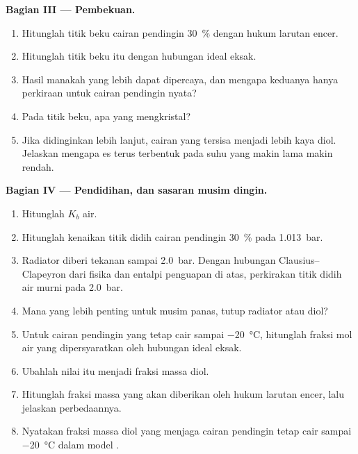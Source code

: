 \begin{problem}
\medskip
\noindent\textbf{Bagian III --- Pembekuan.}
\begin{enumerate}[resume]
  \item Hitunglah titik beku cairan pendingin \qty{30}{\percent} dengan
        hukum larutan encer.
  \item Hitunglah titik beku itu dengan hubungan ideal eksak.
  \item Hasil manakah yang lebih dapat dipercaya, dan mengapa keduanya
        hanya perkiraan untuk cairan pendingin nyata?
  \item Pada titik beku, apa yang mengkristal?
  \item Jika didinginkan lebih lanjut, cairan yang tersisa menjadi lebih
        kaya diol. Jelaskan mengapa es terus terbentuk pada suhu yang makin
        lama makin rendah.
\end{enumerate}

\medskip
\noindent\textbf{Bagian IV --- Pendidihan, dan sasaran musim dingin.}
\begin{enumerate}[resume]
  \item Hitunglah $K_b$ air.
  \item Hitunglah kenaikan titik didih cairan pendingin \qty{30}{\percent}
        pada \qty{1.013}{bar}.
  \item Radiator diberi tekanan sampai \qty{2.0}{bar}. Dengan hubungan
        Clausius--Clapeyron dari fisika dan entalpi penguapan di atas,
        perkirakan titik didih air murni pada \qty{2.0}{bar}.
  \item Mana yang lebih penting untuk musim panas, tutup radiator atau
        diol?
  \item Untuk cairan pendingin yang tetap cair sampai \qty{-20}{\celsius},
        hitunglah fraksi mol air yang dipersyaratkan oleh hubungan ideal
        eksak.
  \item Ubahlah nilai itu menjadi fraksi massa diol.
  \item Hitunglah fraksi massa yang akan diberikan oleh hukum larutan
        encer, lalu jelaskan perbedaannya.
  \item Nyatakan fraksi massa diol yang menjaga cairan pendingin tetap cair
        sampai \qty{-20}{\celsius} dalam model .
\end{enumerate}
\end{problem}
